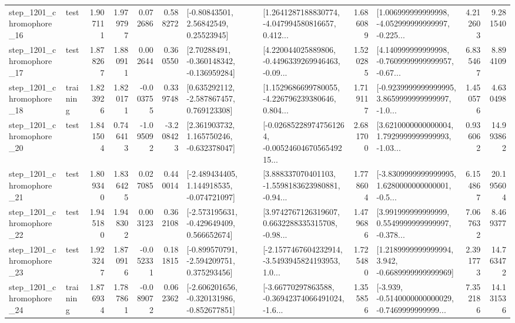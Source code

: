\begin{tabular}{llrrrrllrlrr}
 step\_1201\_chromophore\_16 &      test &      1.907111 &    1.979797 &      0.072686 &  0.588272 &       [-0.80843501, 2.56842549, 0.25523945] &  [1.2641287188830774, -4.047994580816657, 0.412... &       1.686089 &  [1.006999999999998, -4.052999999999997, -0.225... &            4.212603 &          9.281540 \\
 step\_1201\_chromophore\_17 &      test &      1.878267 &    1.880911 &      0.002644 &  0.360550 &    [2.70288491, -0.360148342, -0.136959284] &  [4.220044025889806, -0.4496339269946463, -0.09... &       1.520285 &  [4.140999999999998, -0.7609999999999957, -0.67... &            6.835467 &          8.894109 \\
 step\_1201\_chromophore\_18 &  training &      1.823926 &    1.820171 &     -0.003755 &  0.339748 &    [0.635292112, -2.587867457, 0.769123308] &  [1.1529686699780055, -4.226796239380646, 0.804... &       1.719117 &  [-0.9239999999999995, 3.8659999999999997, -1.0... &            1.450576 &          4.630498 \\
 step\_1201\_chromophore\_20 &      test &      1.841504 &    0.746413 &     -1.095092 & -3.208423 &    [2.361903732, 1.165750246, -0.632378047] &  [-0.026852289747561264, -0.0052460467056549215... &       2.681700 &  [3.6210000000000004, 1.7929999999999993, -1.03... &            0.936062 &         14.993862 \\
 step\_1201\_chromophore\_21 &      test &      1.809340 &    1.836425 &      0.027085 &  0.440014 &   [-2.489434405, 1.144918535, -0.074721097] &  [3.888337070401103, -1.5598183623980881, -0.94... &       1.778604 &  [-3.8309999999999995, 1.6280000000000001, -0.5... &            6.154867 &         20.195604 \\
 step\_1201\_chromophore\_22 &      test &      1.945180 &    1.948302 &      0.003123 &  0.362108 &   [-2.573195631, -0.429649409, 0.566652674] &  [3.9742767126319607, 0.6632288335315708, -0.98... &       1.479686 &  [3.991999999999999, 0.5549999999999997, -0.378... &            7.067632 &          8.469377 \\
 step\_1201\_chromophore\_23 &      test &      1.923247 &    1.870916 &     -0.052331 &  0.181815 &   [-0.899570791, -2.594209751, 0.375293456] &  [-2.1577467604232914, -3.5493945824193953, 1.0... &       1.725480 &   [1.2189999999999994, 3.942, -0.6689999999999969] &            2.391773 &         14.763472 \\
 step\_1201\_chromophore\_24 &  training &      1.876934 &    1.787861 &     -0.089072 &  0.062362 &  [-2.606201656, -0.320131986, -0.852677851] &  [-3.66770297863588, -0.36942374066491024, -1.6... &       1.355856 &  [-3.939, -0.5140000000000029, -0.7469999999999... &            7.352186 &         14.131536 \\

\end{tabular}
